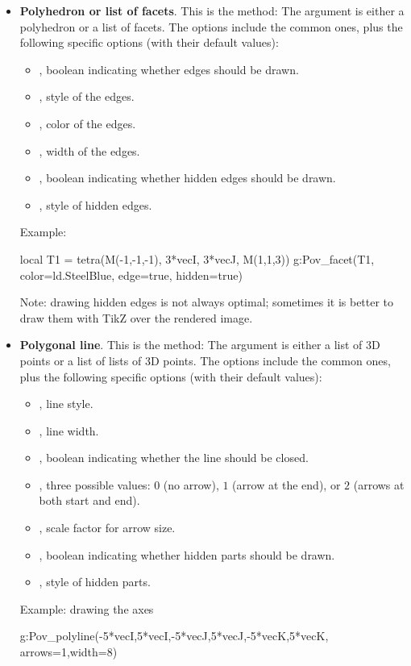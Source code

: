 \begin{itemize}
    \item \textbf{Polyhedron or list of facets}. This is the method:
    The argument  is either a polyhedron or a list of facets. The options include the common ones, plus the following specific options (with their default values): 
    \begin{itemize}
        \item {}, boolean indicating whether edges should be drawn.
        \item {}, style of the edges.
        \item {}, color of the edges.
        \item {}, width of the edges.
        \item {}, boolean indicating whether hidden edges should be drawn.
        \item {}, style of hidden edges.
    \end{itemize}
    Example:
    \begin{Luacode}
    local T1 = tetra(M(-1,-1,-1), 3*vecI, 3*vecJ, M(1,1,3))
    g:Pov_facet(T1, {color=ld.SteelBlue, edge=true, hidden=true})
    \end{Luacode}
    Note: drawing hidden edges is not always optimal; sometimes it is better to draw them with TikZ over the rendered image.
    
    
    \item \textbf{Polygonal line}. This is the method:
    The argument  is either a list of 3D points or a list of lists of 3D points. The options include the common ones, plus the following specific options (with their default values): 
    \begin{itemize}
        \item {}, line style.
        \item {}, line width.
        \item {}, boolean indicating whether the line should be closed.
        \item {}, three possible values: $0$ (no arrow), $1$ (arrow at the end), or $2$ (arrows at both start and end).
        \item {}, scale factor for arrow size.
        \item {}, boolean indicating whether hidden parts should be drawn.
        \item {}, style of hidden parts.
    \end{itemize}
    Example: drawing the axes
    \begin{Luacode}
    g:Pov_polyline({{-5*vecI,5*vecI},{-5*vecJ,5*vecJ},{-5*vecK,5*vecK}}, {arrows=1,width=8})
    \end{Luacode}
    

\end{itemize}
